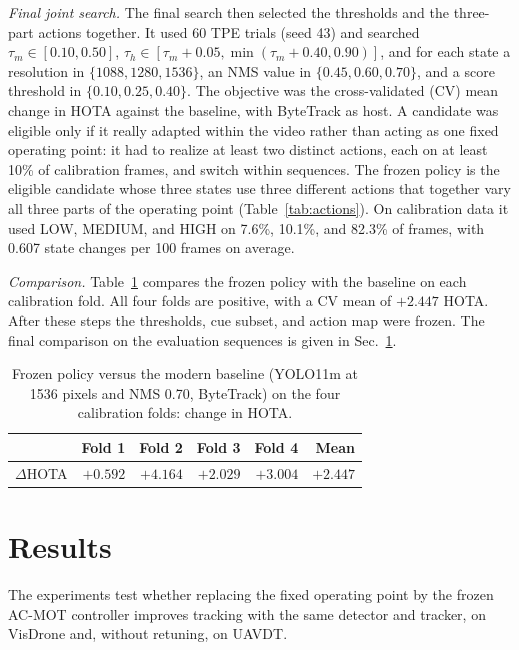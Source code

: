 \documentclass[journal]{new-aiaa}
\begin{document}
\emph{Final joint search.} The final search then selected the thresholds and
the three-part actions together. It used 60 TPE trials (seed 43) and searched
$\tau_m\in[0.10,0.50]$, $\tau_h\in[\tau_m+0.05,\min(\tau_m+0.40,0.90)]$,
and for each state a resolution in $\{1088,1280,1536\}$, an NMS value in
$\{0.45,0.60,0.70\}$, and a score threshold in $\{0.10,0.25,0.40\}$. The
objective was the cross-validated (CV) mean change in HOTA against the
baseline, with ByteTrack as host. A candidate was eligible only if it really adapted within the video
rather than acting as one fixed operating point: it had to realize at least
two distinct actions, each on at least 10\% of calibration frames, and switch
within sequences. The frozen policy is the eligible candidate whose three
states use three different actions that together vary all three parts of the
operating point (Table~\ref{tab:actions}). On calibration data it used LOW,
MEDIUM, and HIGH on 7.6\%, 10.1\%, and 82.3\% of frames, with 0.607 state
changes per 100 frames on average.

\emph{Comparison.} Table~\ref{tab:folds} compares the frozen policy with the
baseline on each calibration fold. All four folds are positive, with a CV
mean of $+2.447$ HOTA. After these steps the thresholds, cue subset, and
action map were frozen. The final comparison on the evaluation sequences is given in Sec.~\ref{sec:results}.


\begin{table}[htbp]
\caption{Frozen policy versus the modern baseline (YOLO11m at 1536 pixels and
NMS 0.70, ByteTrack) on the four calibration folds: change in HOTA.}
\label{tab:folds}
\centering\footnotesize
\begin{tabular}{@{}lrrrrr@{}}
\toprule
 & Fold 1 & Fold 2 & Fold 3 & Fold 4 & Mean\\
\midrule
$\Delta$HOTA & $+0.592$ & $+4.164$ & $+2.029$ & $+3.004$ & $+2.447$\\
\bottomrule
\end{tabular}
\end{table}
\section{Results}\label{sec:results}

The experiments test whether replacing the fixed operating point by the
frozen AC-MOT controller improves tracking with the same detector and
tracker, on VisDrone and, without retuning, on UAVDT.
\end{document}
